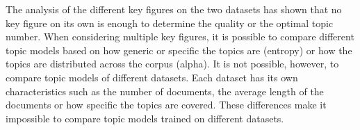The analysis of the different key figures on the two datasets has shown that no key figure on its own is enough to determine the quality or the optimal topic number. When considering multiple key figures, it is possible to compare different topic models based on how generic or specific the topics are (entropy) or how the topics are distributed across the corpus (alpha). It is not possible, however, to compare topic models of different datasets. Each dataset has its own characteristics such as the number of documents, the average length of the documents or how specific the topics are covered. These differences make it impossible to compare topic models trained on different datasets. 




\newpage